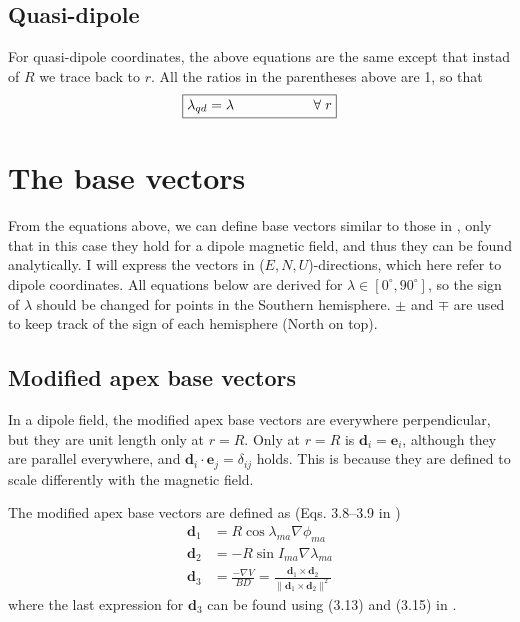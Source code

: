 \documentclass[11pt]{article}
\begin{document}
\subsection{Quasi-dipole}
For quasi-dipole coordinates, the above equations are the same except that instad of $R$ we trace back to $r$. All the ratios in the parentheses above are 1, so that
\begin{equation}
\boxed{\lambda_{qd} = \lambda \hspace{2cm} \forall\hspace{1mm} r}
\end{equation}




\section{The base vectors}
From the equations above, we can define base vectors similar to those in \citet{Richmond95}, only that in this case they hold for a dipole magnetic field, and thus they can be found analytically. I will express the vectors in ($E, N, U$)-directions, which here refer to dipole coordinates. All equations below are derived for $\lambda \in [0^\circ, 90^\circ]$, so the sign of $\lambda$ should be changed for points in the Southern hemisphere. $\pm$ and $\mp$ are used to keep track of the sign of each hemisphere (North on top).

\subsection{Modified apex base vectors}
In a dipole field, the modified apex base vectors are everywhere perpendicular, but they are unit length only at $r=R$. Only at $r=R$ is $\mathbf{d}_i = \mathbf{e}_i$, although they are parallel everywhere, and $\mathbf{d}_i\cdot\mathbf{e}_j = \delta_{ij}$ holds. This is because they are defined to scale differently with the magnetic field.

The modified apex base vectors are defined as (Eqs. 3.8--3.9 in \citet{Richmond95})
\begin{align}
\mathbf{d}_1 &=  R\cos \lambda_{ma}\nabla\phi_{ma} \label{eq:d1}\\
\mathbf{d}_2 &= -R\sin I_{ma}\nabla\lambda_{ma} \label{eq:d2}\\
\mathbf{d}_3 &= \frac{-\nabla V}{BD} = \frac{\mathbf{d}_1\times\mathbf{d}_2}{\|\mathbf{d}_1\times\mathbf{d}_2\|^2}
\end{align}
where the last expression for $\mathbf{d}_3$ can be found using (3.13) and (3.15) in \citet{Richmond95}.
\end{document}
